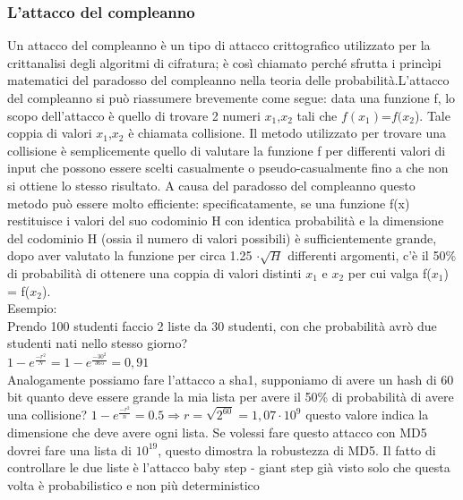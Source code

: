 \documentclass[10pt,a4paper]{article}
\begin{document}
\subsubsection{L'attacco del compleanno}
Un attacco del compleanno è un tipo di attacco crittografico utilizzato per la crittanalisi degli algoritmi di cifratura; è così chiamato perché sfrutta i princìpi matematici del paradosso del compleanno nella teoria delle probabilità.L'attacco del compleanno si può riassumere brevemente come segue: data una funzione f, lo scopo dell'attacco è quello di trovare 2 numeri $x_1$,$x_2$ tali che $f(x_1)$=$f(x_2$). Tale coppia di valori $x_1$,$x_2$ è chiamata collisione. Il metodo utilizzato per trovare una collisione è semplicemente quello di valutare la funzione f per differenti valori di input che possono essere scelti casualmente o pseudo-casualmente fino a che non si ottiene lo stesso risultato. A causa del paradosso del compleanno questo metodo può essere molto efficiente: specificatamente, se una funzione f(x) restituisce i valori del suo codominio H con identica probabilità e la dimensione del codominio H (ossia il numero di valori possibili) è sufficientemente grande, dopo aver valutato la funzione per circa 1.25 $\cdot \sqrt H$ differenti argomenti, c'è il 50\% di probabilità di ottenere una coppia di valori distinti $x_1$ e $x_2$ per cui valga f($x_1$) = f($x_2$).\\
Esempio:\\
Prendo 100 studenti faccio 2 liste da 30 studenti, con che probabilità avrò due studenti nati nello stesso giorno?\\
$1-e^{\frac{-r^2}{N}}= 1-e^{\frac{-30^2}{365}}= 0,91$\\
Analogamente possiamo fare l'attacco a sha1, supponiamo di avere un hash di 60 bit quanto deve essere grande la mia lista per avere il 50\% di probabilità di avere una collisione?
$1-e^{\frac{-r^2}{n}}=0.5 \Rightarrow r=\sqrt{2^{60}} = 1,07\cdot 10^9 $ questo valore indica la dimensione che deve avere ogni lista. Se volessi fare questo attacco con MD5 dovrei fare una lista di $10^{19}$, questo dimostra la robustezza di MD5. Il fatto di controllare le due liste è l'attacco baby step - giant step già visto solo che questa volta è probabilistico e non più deterministico
\end{document}
